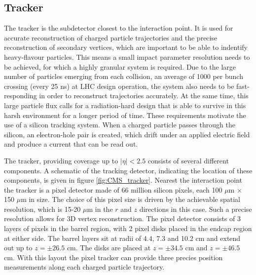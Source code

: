 \subsection{Tracker}
\label{sec:CMSLHC_CMS_tracker}
The tracker \cite{cms-jinst} is the subdetector closest to the interaction point. It
is used for accurate reconstruction of charged particle trajectories and 
the precise reconstruction of secondary vertices, which are important to be
able to indentify heavy-flavour particles. This means a small impact parameter
resolution needs to be achieved, for which a highly granular system is required. 
Due to the large number of particles emerging from 
each collision, an average of 1000 per bunch crossing (every 25 ns) at LHC design operation, the 
system also needs to be fast-responding in order to reconstruct trajectories accurately.
At the same time, this large particle flux calls for a 
radiation-hard design that is able to survive in this harsh environment
for a longer period of time. These requirements motivate the use of a silicon tracking
system. When a charged particle passes through the silicon, an electron-hole pair
is created, which drift under an applied electric field and produce a current
that can be read out. %

The tracker, providing coverage up to $|\eta|<2.5$ consists of 
several different components. A schematic of the tracking detector, indicating
the location of these components, is given in figure \ref{fig:CMS_tracker}.
Nearest the interaction point the tracker is a pixel detector made
of 66 million silicon pixels, each 100 $\mu$m $\times$ 150 $\mu$m in size.
The choice of this pixel size is driven by the achievable spatial resolution,
which is 15-20 $\mu$m in the $r$ and $z$ directions in this case. Such a
precise resolution allows for 3D vertex reconstruction. The pixel
detector consists of 3 layers of pixels in the barrel region, with 2 pixel disks 
placed in the endcap region at either side. The barrel layers sit at radii of
4.4, 7.3 and 10.2 cm and extend out up to $z=\pm 26.5$ cm. The disks are placed
at $z=\pm 34.5$ cm and $z=\pm 46.5$ cm. With this layout the pixel tracker can
provide three precies position measurements along each charged particle trajectory.


